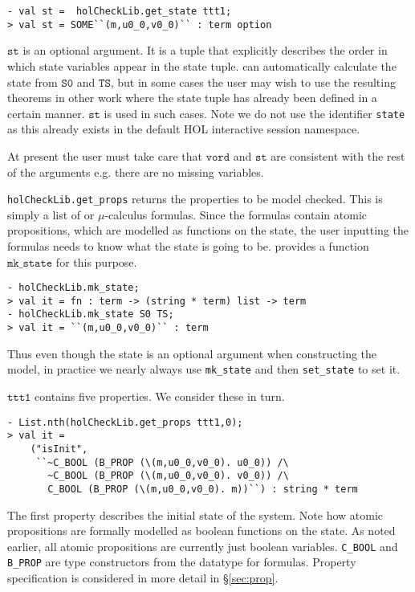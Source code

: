 \begin{session}\begin{verbatim}
- val st =  holCheckLib.get_state ttt1;
> val st = SOME``(m,u0_0,v0_0)`` : term option
\end{verbatim}\end{session}
\(\mathtt{st}\) is an optional argument. It is a \HOL{} tuple that explicitly describes the order in which state variables appear in the state tuple. \hc{} can automatically calculate the state from \(\mathtt{S0}\) and \(\mathtt{TS}\), but in some cases the user may wish to use the resulting theorems in other work where the state tuple has already been defined in a certain manner. \(\mathtt{st}\) is used in such cases. Note we do not use the identifier \texttt{state} as this already exists in the default HOL interactive session namespace.

At present the user must take care that \(\mathtt{vord}\) and \(\mathtt{st}\) are consistent with the rest of the arguments e.g. there are no missing variables.

\texttt{holCheckLib.get\_props} returns the properties to be model checked. This is simply a list of \ctl or \(\mu\)-calculus formulas. Since the formulas contain atomic propositions, which are modelled as functions on the state, the user inputting the formulas needs to know what the state is going to be. \hc{} provides a function \(\mathtt{mk\_state}\) for this purpose.

\begin{session}
\begin{verbatim}
- holCheckLib.mk_state;
> val it = fn : term -> (string * term) list -> term
- holCheckLib.mk_state S0 TS;
> val it = ``(m,u0_0,v0_0)`` : term
\end{verbatim}
\end{session}

Thus even though the state is an optional argument when constructing the model, in practice we nearly always use \texttt{mk\_state} and then \texttt{set\_state} to set it.

\(\mathtt{ttt1}\) contains five \ctl properties. We consider these in turn.

\begin{session}
\begin{verbatim}
- List.nth(holCheckLib.get_props ttt1,0);
> val it =
    ("isInit",
     ``~C_BOOL (B_PROP (\(m,u0_0,v0_0). u0_0)) /\
       ~C_BOOL (B_PROP (\(m,u0_0,v0_0). v0_0)) /\
       C_BOOL (B_PROP (\(m,u0_0,v0_0). m))``) : string * term
\end{verbatim}
\end{session}
The first property describes the initial state of the system. Note how atomic propositions are formally modelled as boolean functions on the state. As noted earlier, all atomic propositions are currently just boolean variables. \texttt{C\_BOOL} and \texttt{B\_PROP} are type constructors from the \HOL{} datatype for \ctl formulas. Property specification is considered in more detail in \S\ref{sec:prop}.

